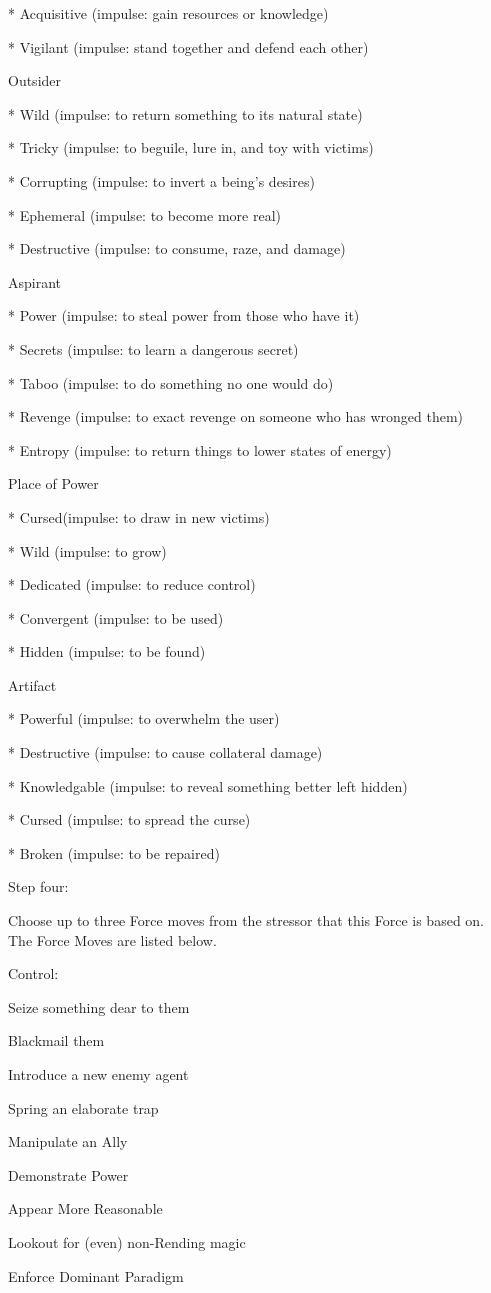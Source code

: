 \documentclass[
  oneside,
  statementpaper,
  9pt]{memoir}
\begin{document}
\begin{MC}
* Acquisitive (impulse: gain resources or knowledge)

* Vigilant (impulse: stand together and defend each other)

Outsider

* Wild (impulse: to return something to its natural state)

* Tricky (impulse: to beguile, lure in, and toy with victims)

* Corrupting (impulse: to invert a being’s desires)

* Ephemeral (impulse: to become more real)

* Destructive (impulse: to consume, raze, and damage)

Aspirant

* Power (impulse: to steal power from those who have it)

* Secrets (impulse: to learn a dangerous secret)

* Taboo (impulse: to do something no one would do)

* Revenge (impulse: to exact revenge on someone who has wronged them)

* Entropy (impulse: to return things to lower states of energy)

Place of Power

* Cursed(impulse: to draw in new victims)

* Wild (impulse: to grow)

* Dedicated (impulse: to reduce control)

* Convergent (impulse: to be used)

* Hidden (impulse: to be found)

Artifact

* Powerful (impulse: to overwhelm the user)

* Destructive (impulse: to cause collateral damage)

* Knowledgable (impulse: to reveal something better left hidden)

* Cursed (impulse: to spread the curse)

* Broken (impulse: to be repaired)

Step four:

Choose up to three Force moves from the stressor that this Force is based on. The Force Moves are listed below.

Control:

\begin{itemize*}

\item Seize something dear to them 
\item Blackmail them 
\item Introduce a new enemy agent 
\item Spring an elaborate trap 
\item Manipulate an Ally 
\item Demonstrate Power 
\item Appear More Reasonable 
\item Lookout for (even) non-Rending magic 
\item Enforce Dominant Paradigm 


\end{itemize*}
\end{MC}
\end{document}
